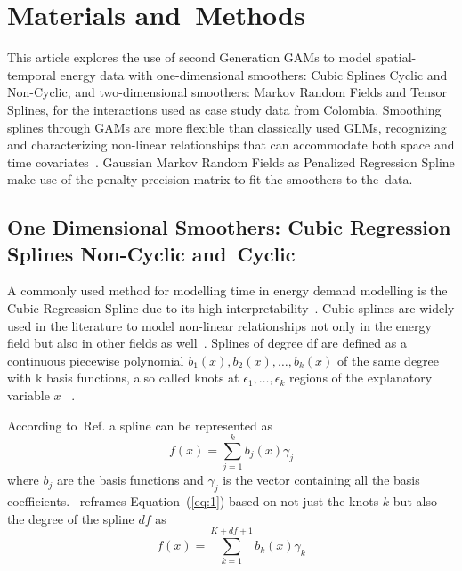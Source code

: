 \documentclass[energies,article,accept,pdftex,moreauthors]{Definitions/mdpi}
\begin{document}


\section{Materials and~Methods}


This article explores the use of second Generation GAMs to model spatial-temporal energy data with one-dimensional smoothers: Cubic Splines Cyclic and Non-Cyclic, and two-dimensional smoothers: Markov Random Fields and Tensor Splines, for the interactions used as case study data from Colombia. 
Smoothing splines through GAMs are more flexible than classically used GLMs, recognizing and characterizing non-linear relationships that can accommodate both space and time covariates~\citep{Amato2020ForecastingComponents}. Gaussian Markov Random Fields as Penalized Regression Spline make use of the penalty precision matrix to fit the smoothers to the~data.  \clearpage

     \subsection{One Dimensional Smoothers: Cubic Regression Splines Non-Cyclic and~Cyclic}
     A commonly used method for modelling time in energy demand modelling is the Cubic Regression Spline due to its high interpretability~\citep{Wood2017GeneralizedR}. Cubic splines are widely used in the literature to model non-linear relationships not only in the energy field but also in other fields as well~\citep{SalemJornaz2016ModelingComponents,Perperoglou2019AR}. Splines of degree df are defined as a continuous piecewise polynomial  \(b_1(x),b_2(x),…,b_k(x)\)  of the same degree with k basis functions, also called knots at \(\epsilon_1,…,\epsilon_k\) regions of the explanatory variable $x$ ~\citep{Hastie1999GeneralizedModels}.
     
     According to~Ref. \citep{Wood2017GeneralizedR} a spline can be represented as
\begin{equation}\label{eq:1}
     f(x)=\sum_{j=1}^{k}b_{j}(x)\gamma_{j}
     \end{equation}
where $b_j$  are the basis functions and $\gamma_j$ is the vector containing all the basis coefficients.~\citep{Perperoglou2019AR} reframes Equation~(\ref{eq:1}) based on not just the knots $k$ but also the degree of the spline $df$ as
\begin{equation}
    f(x)=\sum_{k=1}^{K+df+1}b_{k}(x)\gamma_{k}
     \end{equation}
     
\end{document}
